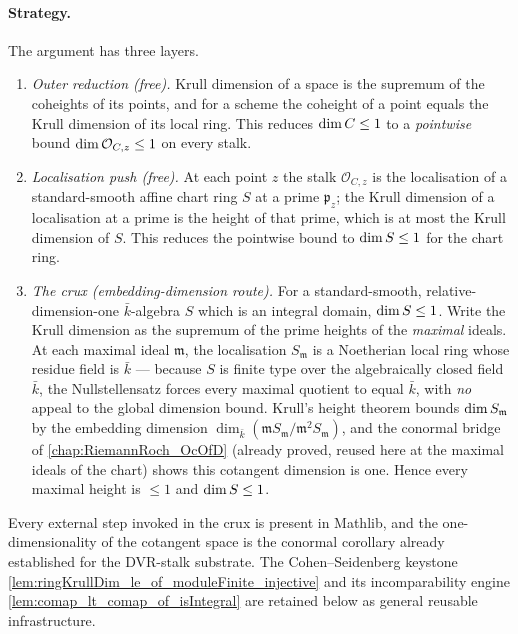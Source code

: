 \paragraph{Strategy.}  The argument has three layers.

\begin{enumerate}
  \item \emph{Outer reduction (free).}  Krull dimension of a space is the supremum of
    the coheights of its points, and for a scheme the coheight of a point equals the
    Krull dimension of its local ring.  This reduces \(\dim C \le 1\) to a
    \emph{pointwise} bound \(\dim \mathcal O_{C,z} \le 1\) on every stalk.
  \item \emph{Localisation push (free).}  At each point \(z\) the stalk
    \(\mathcal O_{C,z}\) is the localisation of a standard-smooth affine chart ring
    \(S\) at a prime \(\mathfrak p_z\); the Krull dimension of a localisation at a
    prime is the height of that prime, which is at most the Krull dimension of \(S\).
    This reduces the pointwise bound to \(\dim S \le 1\) for the chart ring.
  \item \emph{The crux (embedding-dimension route).}  For a
    standard-smooth, relative-dimension-one \(\bar k\)-algebra \(S\) which is an
    integral domain, \(\dim S \le 1\).  Write the Krull dimension as the
    supremum of the prime heights of the \emph{maximal} ideals.  At each maximal
    ideal \(\mathfrak m\), the localisation \(S_\mathfrak m\) is a Noetherian local
    ring whose residue field is \(\bar k\) --- because \(S\) is finite type over the
    algebraically closed field \(\bar k\), the Nullstellensatz forces every maximal
    quotient to equal \(\bar k\), with \emph{no} appeal to the global dimension bound.
    Krull's height theorem bounds \(\dim S_\mathfrak m\) by the embedding
    dimension \(\dim_{\bar k}(\mathfrak m S_\mathfrak m / \mathfrak m^2 S_\mathfrak
    m)\), and the conormal bridge of \cref{chap:RiemannRoch_OcOfD} (already
    proved, reused here at the maximal ideals of the chart) shows this cotangent
    dimension is one.  Hence every maximal height is \(\le 1\) and \(\dim S \le
    1\).
\end{enumerate}

Every external step invoked in the crux is present in Mathlib, and the
one-dimensionality of the cotangent space is the conormal corollary already
established for the DVR-stalk substrate.  The Cohen--Seidenberg keystone
\cref{lem:ringKrullDim_le_of_moduleFinite_injective} and its incomparability engine
\cref{lem:comap_lt_comap_of_isIntegral} are retained below as general reusable
infrastructure.

